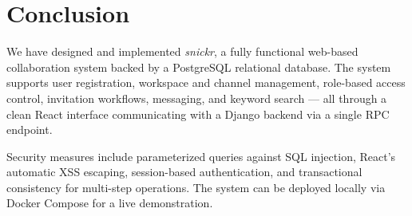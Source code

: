 \documentclass[11pt]{article}
\begin{document}
\section{Conclusion}

We have designed and implemented \textit{snickr}, a fully functional web-based collaboration system backed by a PostgreSQL relational database. The system supports user registration, workspace and channel management, role-based access control, invitation workflows, messaging, and keyword search --- all through a clean React interface communicating with a Django backend via a single RPC endpoint.

Security measures include parameterized queries against SQL injection, React's automatic XSS escaping, session-based authentication, and transactional consistency for multi-step operations. The system can be deployed locally via Docker Compose for a live demonstration.
\end{document}
